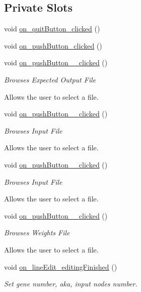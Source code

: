 \subsection*{Private Slots}
\begin{DoxyCompactItemize}
\item 
void \hyperlink{a00002_a5acc81766a1842665846092ebf0815e0}{on\-\_\-quit\-Button\-\_\-clicked} ()
\item 
void \hyperlink{a00002_a043466f485b6b75ee25ee879121c1ecc}{on\-\_\-push\-Button\-\_\-clicked} ()
\item 
void \hyperlink{a00002_a09eeb721e4f861e80da92d8ed42277ee}{on\-\_\-push\-Button\-\_\-\_\-clicked} ()
\begin{DoxyCompactList}\small\item\em Browses Expected Output File\par
 Allows the user to select a file. \end{DoxyCompactList}\item 
void \hyperlink{a00002_a9a338258e3edb0d5ab1aabc26dd34d40}{on\-\_\-push\-Button\-\_\-\_\-clicked} ()
\begin{DoxyCompactList}\small\item\em Browses Input File\par
 Allows the user to select a file. \end{DoxyCompactList}\item 
void \hyperlink{a00002_a6fd99e6dc89a1f3d352c037c880ef345}{on\-\_\-push\-Button\-\_\-\_\-clicked} ()
\begin{DoxyCompactList}\small\item\em Browses Input File\par
 Allows the user to select a file. \end{DoxyCompactList}\item 
void \hyperlink{a00002_a8b08d8812751902c52d56efc45d0b58d}{on\-\_\-push\-Button\-\_\-\_\-clicked} ()
\begin{DoxyCompactList}\small\item\em Browses Weights File\par
 Allows the user to select a file. \end{DoxyCompactList}\item 
void \hyperlink{a00002_ab5da77a34a83e9794edda0d77d79bec0}{on\-\_\-line\-Edit\-\_\-editing\-Finished} ()
\begin{DoxyCompactList}\small\item\em Set gene number, aka, input nodes number. \end{DoxyCompactList}\item 

\end{DoxyCompactItemize}
